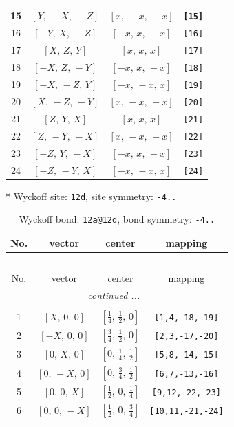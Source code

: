 \documentclass[fleqn,8pt]{jsarticle}
\begin{document}
\begin{longtable}{cccc}
15 & $\left[ Y,\, - X,\, - Z \right]$ & $\left[ x,\, - x,\, - x \right]$ & {\tt [15]} \\ \hline
16 & $\left[ - Y,\, X,\, - Z \right]$ & $\left[ - x,\, x,\, - x \right]$ & {\tt [16]} \\ \hline
17 & $\left[ X,\, Z,\, Y \right]$ & $\left[ x,\, x,\, x \right]$ & {\tt [17]} \\ \hline
18 & $\left[ - X,\, Z,\, - Y \right]$ & $\left[ - x,\, x,\, - x \right]$ & {\tt [18]} \\ \hline
19 & $\left[ - X,\, - Z,\, Y \right]$ & $\left[ - x,\, - x,\, x \right]$ & {\tt [19]} \\ \hline
20 & $\left[ X,\, - Z,\, - Y \right]$ & $\left[ x,\, - x,\, - x \right]$ & {\tt [20]} \\ \hline
21 & $\left[ Z,\, Y,\, X \right]$ & $\left[ x,\, x,\, x \right]$ & {\tt [21]} \\ \hline
22 & $\left[ Z,\, - Y,\, - X \right]$ & $\left[ x,\, - x,\, - x \right]$ & {\tt [22]} \\ \hline
23 & $\left[ - Z,\, Y,\, - X \right]$ & $\left[ - x,\, x,\, - x \right]$ & {\tt [23]} \\ \hline
24 & $\left[ - Z,\, - Y,\, X \right]$ & $\left[ - x,\, - x,\, x \right]$ & {\tt [24]} \\
\end{longtable}
* Wyckoff site: {\tt 12d}, site symmetry: {\tt -4..}
\renewcommand{\arraystretch}{1.2}
\begin{longtable}{cccc}
\caption{Wyckoff bond: {\tt 12a@12d}, bond symmetry: {\tt -4..}}
 \\
 \hline \hline
No. & vector & center & mapping \\ \hline \endfirsthead

\multicolumn{3}{l}{\tablename\ \thetable{}} \\
 \hline \hline
No. & vector & center & mapping \\ \hline \endhead

 \hline \hline
\multicolumn{3}{r}{\footnotesize\it continued ...} \\ \endfoot

 \hline \hline
\multicolumn{3}{r}{} \\ \endlastfoot

1 & $\left[ X,\, 0,\, 0 \right]$ & $\left[ \frac{1}{4},\, \frac{1}{2},\, 0 \right]$ & {\tt [1,4,-18,-19]} \\ \hline
2 & $\left[ - X,\, 0,\, 0 \right]$ & $\left[ \frac{3}{4},\, \frac{1}{2},\, 0 \right]$ & {\tt [2,3,-17,-20]} \\ \hline
3 & $\left[ 0,\, X,\, 0 \right]$ & $\left[ 0,\, \frac{1}{4},\, \frac{1}{2} \right]$ & {\tt [5,8,-14,-15]} \\ \hline
4 & $\left[ 0,\, - X,\, 0 \right]$ & $\left[ 0,\, \frac{3}{4},\, \frac{1}{2} \right]$ & {\tt [6,7,-13,-16]} \\ \hline
5 & $\left[ 0,\, 0,\, X \right]$ & $\left[ \frac{1}{2},\, 0,\, \frac{1}{4} \right]$ & {\tt [9,12,-22,-23]} \\ \hline
6 & $\left[ 0,\, 0,\, - X \right]$ & $\left[ \frac{1}{2},\, 0,\, \frac{3}{4} \right]$ & {\tt [10,11,-21,-24]} \\
\end{longtable}
\end{document}
